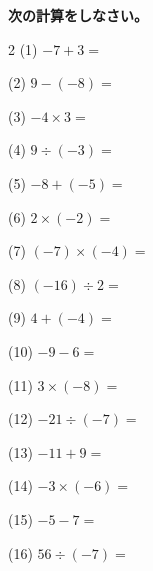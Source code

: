 \documentclass[a4paper, 11pt]{ltjsarticle}
\begin{document}
\hspace{1em} {\Large \textbf{次の計算をしなさい。}}
\hfill


\vspace*{5ex}

\begin{multicols*}{2}
\noindent (1) \quad $-7+3 =$
\vspace*{\fill}

\noindent (2) \quad $9-(-8) =$
\vspace*{\fill}

\noindent (3) \quad $-4\times3 =$
\vspace*{\fill}

\noindent (4) \quad $9\div(-3) =$
\vspace*{\fill}

\noindent (5) \quad $-8+(-5) =$
\vspace*{\fill}

\noindent (6) \quad $2\times(-2) =$
\vspace*{\fill}

\noindent (7) \quad $(-7)\times(-4) =$
\vspace*{\fill}

\noindent (8) \quad $(-16)\div2 =$
\vspace*{\fill}

\noindent (9) \quad $4+(-4) =$
\vspace*{\fill}

\noindent (10) \quad $-9-6 =$
\vspace*{\fill}
\columnbreak

\noindent (11) \quad $3\times(-8) =$
\vspace*{\fill}

\noindent (12) \quad $-21\div(-7) =$
\vspace*{\fill}

\noindent (13) \quad $-11+9 =$
\vspace*{\fill}

\noindent (14) \quad $-3\times(-6) =$
\vspace*{\fill}

\noindent (15) \quad $-5-7 =$
\vspace*{\fill}

\noindent (16) \quad $56\div(-7) =$
\vspace*{\fill}


\end{multicols*}
\end{document}
